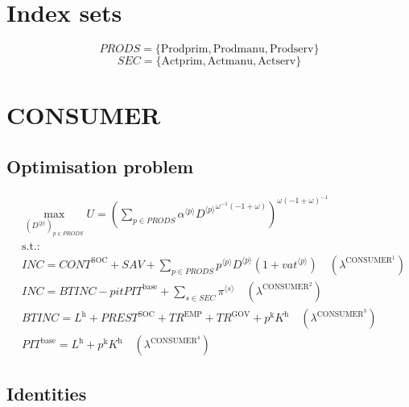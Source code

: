 

\section*{Index sets}

$${P\!R\!O\!D\!S} = \{ \mathrm{Prodprim}, \mathrm{Prodmanu}, \mathrm{Prodserv} \}$$
$${S\!E\!C} = \{ \mathrm{Actprim}, \mathrm{Actmanu}, \mathrm{Actserv} \}$$

\section{CONSUMER}

\subsection{Optimisation problem}

\begin{align}
&\max_{\left({D}^{\langle p\rangle}\right)_{p\in {P\!R\!O\!D\!S}}
} U = \left(\sum_{p\in {P\!R\!O\!D\!S}} {{\alpha}^{\langle p\rangle}} {{{D}^{\langle p\rangle}}^{{\omega}^{-1} \left(-1 + \omega\right)}}\right)^{{\omega} \left(-1 + \omega\right)^{-1}}\\
&\mathrm{s.t.:}\nonumber\\
& {I\!N\!C} = {C\!O\!N\!T}^{\mathrm{SOC}} + {S\!A\!V} + \sum_{p\in {P\!R\!O\!D\!S}} {{p}^{\langle p\rangle}} {{D}^{\langle p\rangle}} \left(1 + {{v\!a\!t}}^{\langle p\rangle}\right) \quad \left(\lambda^{\mathrm{CONSUMER}^{\mathrm{1}}}\right)\\
& {I\!N\!C} = {B\!T\!I\!N\!C} - {{p\!i\!t}} {{P\!I\!T}^{\mathrm{base}}} + \sum_{s\in {S\!E\!C}} {\pi}^{\langle s\rangle} \quad \left(\lambda^{\mathrm{CONSUMER}^{\mathrm{2}}}\right)\\
& {B\!T\!I\!N\!C} = L^{\mathrm{h}} + {P\!R\!E\!S\!T}^{\mathrm{SOC}} + {T\!R}^{\mathrm{EMP}} + {T\!R}^{\mathrm{GOV}} + {p^{\mathrm{k}}} {K^{\mathrm{h}}} \quad \left(\lambda^{\mathrm{CONSUMER}^{\mathrm{3}}}\right)\\
& {P\!I\!T}^{\mathrm{base}} = L^{\mathrm{h}} + {p^{\mathrm{k}}} {K^{\mathrm{h}}} \quad \left(\lambda^{\mathrm{CONSUMER}^{\mathrm{4}}}\right)
\end{align}


\subsection{Identities}

